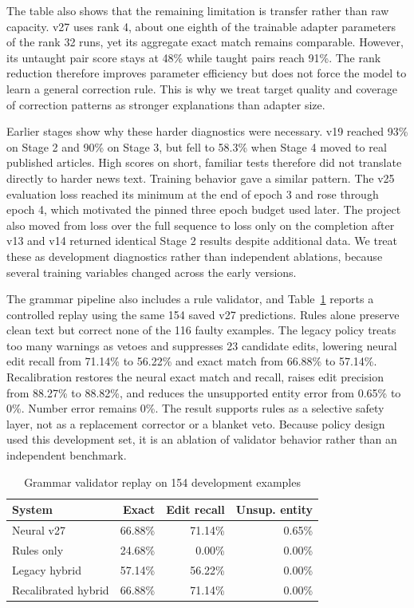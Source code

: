 \documentclass[a4paper,conference]{IEEEtran}
\begin{document}
The table also shows that the remaining limitation is transfer rather than raw
capacity. v27 uses rank 4, about one eighth of the trainable adapter parameters
of the rank 32 runs, yet its aggregate exact match remains comparable. However,
its untaught pair score stays at 48\% while taught pairs reach 91\%. The rank
reduction therefore improves parameter efficiency but does not force the model
to learn a general correction rule. This is why we treat target quality and
coverage of correction patterns as stronger explanations than adapter size.

Earlier stages show why these harder diagnostics were necessary. v19 reached
93\% on Stage 2 and 90\% on Stage 3, but fell to 58.3\% when Stage 4 moved to
real published articles. High scores on short, familiar tests therefore did not
translate directly to harder news text. Training behavior gave a similar
pattern. The v25 evaluation loss reached its minimum at the end of epoch 3 and rose
through epoch 4, which motivated the pinned three epoch budget used later. The
project also moved from loss over the full sequence to loss only on the completion after v13
and v14 returned identical Stage 2 results despite additional data. We treat
these as development diagnostics rather than independent ablations, because
several training variables changed across the early versions.

The grammar pipeline also includes a rule validator, and Table~\ref{tab:hybrid}
reports a controlled replay using the same 154 saved v27 predictions. Rules
alone preserve clean text but correct none of the 116 faulty examples. The
legacy policy treats too many warnings as vetoes and suppresses 23
candidate edits, lowering neural edit recall from 71.14\% to 56.22\%
and exact match from 66.88\% to 57.14\%. Recalibration restores the neural exact
match and recall, raises edit precision from 88.27\% to 88.82\%, and reduces the
unsupported entity error from 0.65\% to 0\%. Number error remains 0\%.
The result supports rules as a selective safety layer, not as a replacement
corrector or a blanket veto. Because policy design used this development set,
it is an ablation of validator behavior rather than an independent benchmark.

\begin{table}[!b]
\caption{Grammar validator replay on 154 development examples}
\label{tab:hybrid}
\centering
\footnotesize
\setlength{\tabcolsep}{2.3pt}
\renewcommand{\arraystretch}{1.03}
\begin{tabular}{|l|r|r|r|}
\hline
\textbf{System} & \textbf{Exact} & \textbf{Edit recall} & \textbf{Unsup. entity} \\
\hline
Neural v27 & 66.88\% & 71.14\% & 0.65\% \\
\hline
Rules only & 24.68\% & 0.00\% & 0.00\% \\
\hline
Legacy hybrid & 57.14\% & 56.22\% & 0.00\% \\
\hline
Recalibrated hybrid & 66.88\% & 71.14\% & 0.00\% \\
\hline
\end{tabular}
\end{table}
\end{document}
